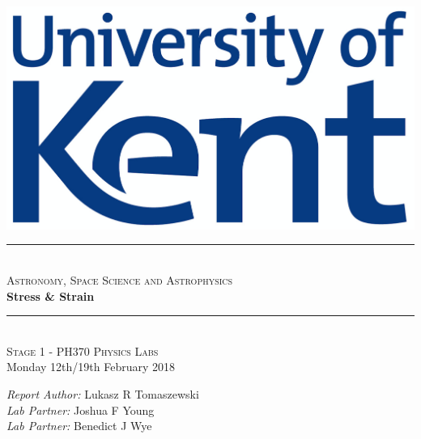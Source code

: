 \documentclass[11pt]{article}
\begin{document}
\begin{titlepage}

\newcommand{\HRule}{\rule{\linewidth}{0.5mm}}

\begin{centering} 
 

\includegraphics[scale=0.4]{Uni_of_Kent_Logo.png}\\[1cm]


\HRule \\[0.4cm]
\textsc{\large Astronomy, Space Science and Astrophysics}\\[0.4cm]
{\huge \bfseries Stress \& Strain}\\[0.4cm]
\HRule \\[1.0cm]


\textsc{\Large Stage 1 - PH370 Physics Labs}\\[0.5cm] 
{\large Monday 12th/19th February 2018}\\[1.0cm]


\begin{minipage}{0.625\textwidth}
\centering

\emph{\large Report Author:} \large Lukasz R Tomaszewski \\ [0.2cm]
\emph{\large Lab Partner:} \large Joshua F Young \\
\emph{\large Lab Partner:} \large Benedict J Wye \\

\end{minipage}\\[2cm]

\vfill
\end{centering} 
\end{titlepage}
\end{document}
